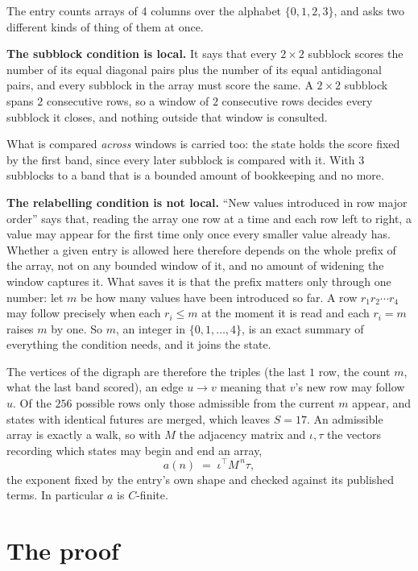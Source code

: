 \documentclass[11pt,a4paper]{article}
\theoremstyle{plain}
\theoremstyle{definition}
\begin{document}
The entry counts arrays of 4 columns over the alphabet $\{0,1,2,3\}$, and asks two different kinds of thing of them at once.

\textbf{The subblock condition is local.} It says that every $2\times2$ subblock scores the number of its equal diagonal pairs plus the number of its equal antidiagonal pairs, and every subblock in the array must score the same. A $ 2\times2$ subblock spans $2$ consecutive rows, so a window of $2$ consecutive rows decides every subblock it closes, and nothing outside that window is consulted.

What is compared \emph{across} windows is carried too: the state holds the score fixed by the first band, since every later subblock is compared with it. With $3$ subblocks to a band that is a bounded amount of bookkeeping and no more.

\textbf{The relabelling condition is not local.} ``New values introduced in row major order'' says that, reading the array one row at a time and each row left to right, a value may appear for the first time only once every smaller value already has. Whether a given entry is allowed here therefore depends on the whole prefix of the array, not on any bounded window of it, and no amount of widening the window captures it. What saves it is that the prefix matters only through one number: let $m$ be how many values have been introduced so far. A row $r_1r_2\cdots r_4$ may follow precisely when each $r_i\le m$ at the moment it is read and each $r_i=m$ raises $m$ by one. So $m$, an integer in $\{0,1,\dots,4\}$, is an exact summary of everything the condition needs, and it joins the state.

The vertices of the digraph are therefore the triples (the last $1$ row, the count $m$, what the last band scored), an edge $u\to v$ meaning that $v$'s new row may follow $u$. Of the $256$ possible rows only those admissible from the current $m$ appear, and states with identical futures are merged, which leaves $S=17$. An admissible array is exactly a walk, so with $M$ the adjacency matrix and $\iota,\tau$ the vectors recording which states may begin and end an array,
\[
a(n)\;=\;\iota^{\!\top}M^{\,n}\tau ,
\]
the exponent fixed by the entry's own shape and checked against its published terms. In
particular $a$ is $C$-finite.

\section{The proof}
\end{document}
